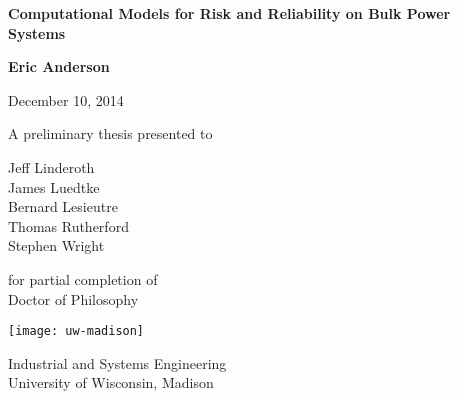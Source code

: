 \begin{titlepage}
    \begin{center}
        \vspace*{2cm}
        
{\Large        \textbf{Computational Models for Risk and Reliability on Bulk Power Systems}}
                
        \vspace{1.5cm}
        
        \textbf{Eric Anderson}

        \vspace{.2cm}

        December 10, 2014

        \vfill
        
        A preliminary thesis presented to

        \vspace{.25cm}

        Jeff Linderoth\\
        James Luedtke\\
        Bernard Lesieutre \\
        Thomas Rutherford\\
        Stephen Wright

        \vspace{.45cm}

        for partial completion of\\
        Doctor of Philosophy\\
        
        \vspace{0.3cm}
        
        \texttt{[image: uw-madison]}
       
        Industrial and Systems Engineering\\        
        University of Wisconsin, Madison\\
        
        \vspace{1.5cm}

        
    \end{center}
\end{titlepage}
